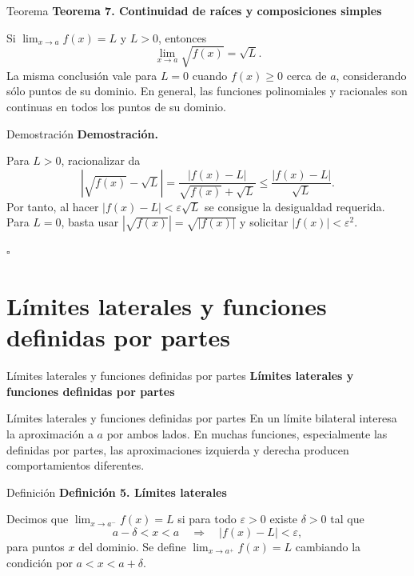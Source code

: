\documentclass[12pt,aspectratio=169]{beamer}
\begin{document}
\begin{frame}[t,allowframebreaks]{Teorema}
{\color{azul}\bfseries Teorema 7. Continuidad de raíces y composiciones simples}\par\medskip

Si $\lim_{x\to a}f(x)=L$ y $L>0$, entonces
\[
 \lim_{x\to a}\sqrt{f(x)}=\sqrt L.
\]
La misma conclusión vale para $L=0$ cuando $f(x)\ge0$ cerca de $a$, considerando sólo puntos de su dominio. En general, las funciones polinomiales y racionales son continuas en todos los puntos de su dominio.
\end{frame}


\begin{frame}[t,allowframebreaks]{Demostración}
{\color{azul}\bfseries Demostración.}\par\smallskip

Para $L>0$, racionalizar da
\[
 |\sqrt{f(x)}-\sqrt L|=\frac{|f(x)-L|}{\sqrt{f(x)}+\sqrt L}\le\frac{|f(x)-L|}{\sqrt L}.
\]
Por tanto, al hacer $|f(x)-L|<\varepsilon\sqrt L$ se consigue la desigualdad requerida. Para $L=0$, basta usar $|\sqrt{f(x)}|=\sqrt{|f(x)|}$ y solicitar $|f(x)|<\varepsilon^2$.

\hfill $\square$
\end{frame}


\section{Límites laterales y funciones definidas por partes}

\begin{frame}[t]{Límites laterales y funciones definidas por partes}
\centering\vfill{\Large\bfseries\color{azul} Límites laterales y funciones definidas por partes}\vfill
\end{frame}


\begin{frame}[t,allowframebreaks]{Límites laterales y funciones definidas por partes}
En un límite bilateral interesa la aproximación a $a$ por ambos lados. En muchas funciones, especialmente las definidas por partes, las aproximaciones izquierda y derecha producen comportamientos diferentes.
\end{frame}


\begin{frame}[t,allowframebreaks]{Definición}
{\color{azul}\bfseries Definición 5. Límites laterales}\par\medskip

Decimos que $\lim_{x\to a^-}f(x)=L$ si para todo $\varepsilon>0$ existe $\delta>0$ tal que
\[
 a-\delta<x<a\quad\Longrightarrow\quad |f(x)-L|<\varepsilon,
\]
para puntos $x$ del dominio. Se define $\lim_{x\to a^+}f(x)=L$ cambiando la condición por $a<x<a+\delta$.
\end{frame}
\end{document}
